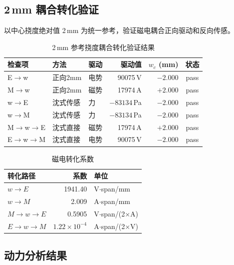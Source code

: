 \documentclass[12pt,a4paper]{ctexart}
\begin{document}
\subsection{2\,mm 耦合转化验证}

以中心挠度绝对值 2\,mm 为统一参考，验证磁电耦合正向驱动和反向传感。

\begin{table}[H]
\centering
\caption{2\,mm 参考挠度耦合转化验证结果}
\label{tab:coupling}
\small
\begin{tabular}{p{1.8cm}p{2.5cm}lrrc}
\toprule
\textbf{检查项} & \textbf{方法} & \textbf{驱动} & \textbf{驱动值} & $w_c$ (mm) & \textbf{状态} \\
\midrule
E$\to$w & 正向2mm & 电势 & 90075\,V & $-2.000$ & \textcolor{passgreen}{pass} \\
M$\to$w & 正向2mm & 磁势 & 17974\,A & $+2.000$ & \textcolor{passgreen}{pass} \\
w$\to$E & 沈式传感 & 力 & $-83134$\,Pa & $-2.000$ & \textcolor{passgreen}{pass} \\
w$\to$M & 沈式传感 & 力 & $-83134$\,Pa & $-2.000$ & \textcolor{passgreen}{pass} \\
M$\to$w$\to$E & 沈式直接 & 磁势 & 17974\,A & $+2.000$ & \textcolor{passgreen}{pass} \\
E$\to$w$\to$M & 沈式直接 & 电势 & 90075\,V & $-2.000$ & \textcolor{passgreen}{pass} \\
\bottomrule
\end{tabular}
\end{table}

\begin{table}[H]
\centering
\caption{磁电转化系数}
\label{tab:coupling-coeff}
\begin{tabular}{lrl}
\toprule
\textbf{转化路径} & \textbf{系数} & \textbf{单位} \\
\midrule
$w \to E$ & 1941.40 & V$\cdot$span/mm \\
$w \to M$ & 2.009 & A$\cdot$span/mm \\
$M \to w \to E$ & 0.5905 & V$\cdot$span/(2$\times$A) \\
$E \to w \to M$ & $1.22\times10^{-4}$ & A$\cdot$span/(2$\times$V) \\
\bottomrule
\end{tabular}
\end{table}

\subsection{动力分析结果}
\end{document}
